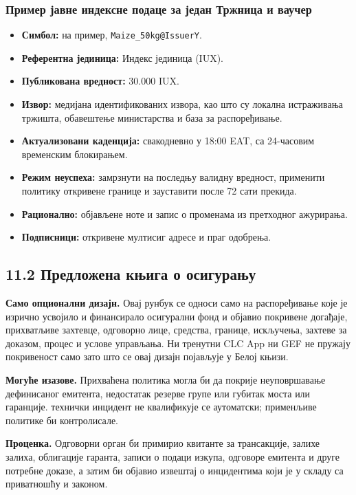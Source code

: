 \documentclass[11pt]{article}
\begin{document}
\subsubsection*{Пример јавне индексне подаце за један Тржница и ваучер}

\begin{itemize}[leftmargin=*]
\item \textbf{Симбол:} на пример, \texttt{Maize\_50kg@IssuerY}.
\item \textbf{Референтна јединица:} Индекс јединица (IUX).
\item \textbf{Публикована вредност:} 30.000 IUX.
\item \textbf{Извор:} медијана идентификованих извора, као што су локална истраживања тржишта, обавештење министарства и база за распоређивање.
\item \textbf{Актуализовани каденција:} свакодневно у 18:00 EAT, са 24-часовим временским блокирањем.
\item \textbf{Режим неуспеха:} замрзнути на последњу валидну вредност, применити политику откривене границе и зауставити после 72 сати прекида.
\item \textbf{Рационално:} објављене ноте и запис о променама из претходног ажурирања.
\item \textbf{Подписници:} откривене мултисиг адресе и праг одобрења.
\end{itemize}
\subsection*{11.2 Предложена књига о осигурању}

\textbf{Само опционални дизајн.} Овај рунбук се односи само на распоређивање које је изрично усвојило и финансирало осигурални фонд и објавио покривене догађаје, прихватљиве захтевце, одговорно лице, средства, границе, искључења, захтеве за доказом, процес и услове управљања. Ни тренутни CLC App ни GEF не пружају покривеност само зато што се овај дизајн појављује у Белој књизи.

\textbf{Могуће изазове.} Прихваћена политика могла би да покрије неуповршавање дефинисаног емитента, недостатак резерве групе или губитак моста или гаранције. технички инцидент не квалификује се аутоматски; применљиве политике би контролисале.

\textbf{Проценка.} Одговорни орган би примирио квитанте за трансакције, залихе залиха, облигације гаранта, записи о подаци изкупа, одговоре емитента и друге потребне доказе, а затим би објавио извештај о инцидентима који је у складу са приватношћу и законом.
\end{document}
